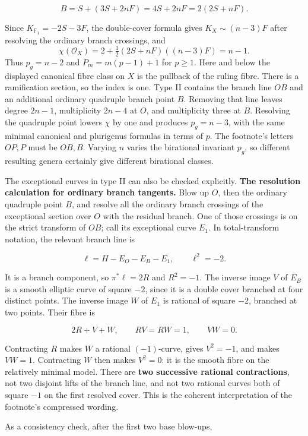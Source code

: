 \[
B=S+(3S+2nF)=4S+2nF=2(2S+nF).
\]

Since \(K_{\mathbb F_1}=-2S-3F\), the double-cover formula gives \(K_X\sim(n-3)F\) after resolving the ordinary branch crossings, and
\[
\chi(\mathcal O_X)=2+\tfrac12(2S+nF)((n-3)F)=n-1.
\]
Thus \(p_g=n-2\) and \(P_m=m(p-1)+1\) for \(p\ge1\). Here and below the displayed canonical fibre class on \(X\) is the pullback of the ruling fibre. There is a ramification section, so the index is one. Type II contains the branch line \(OB\) and an additional ordinary quadruple branch point \(B\). Removing that line leaves degree \(2n-1\), multiplicity \(2n-4\) at \(O\), and multiplicity three at \(B\). Resolving the quadruple point lowers \(\chi\) by one and produces \(p_g=n-3\), with the same minimal canonical and plurigenus formulas in terms of \(p\). The footnote's letters \(OP,P\) must be \(OB,B\). Varying \(n\) varies the birational invariant \(p_g\), so different resulting genera certainly give different birational classes.

The exceptional curves in type II can also be checked explicitly. \textbf{The resolution calculation for ordinary branch tangents.} Blow up \(O\), then the ordinary quadruple point \(B\), and resolve all the ordinary branch crossings of the exceptional section over \(O\) with the residual branch. One of those crossings is on the strict transform of \(OB\); call its exceptional curve \(E_1\). In total-transform notation, the relevant branch line is

\[
\ell=H-E_O-E_B-E_1,\qquad \ell^2=-2.
\]

It is a branch component, so \(\pi^*\ell=2R\) and \(R^2=-1\). The inverse image \(V\) of \(E_B\) is a smooth elliptic curve of square \(-2\), since it is a double cover branched at four distinct points. The inverse image \(W\) of \(E_1\) is rational of square \(-2\), branched at two points. Their fibre is

\[
2R+V+W,\qquad R V=R W=1,\qquad V W=0.
\]

Contracting \(R\) makes \(W\) a rational \((-1)\)-curve, gives \(V^2=-1\), and makes \(V W=1\). Contracting \(W\) then makes \(V^2=0\): it is the smooth fibre on the relatively minimal model. There are \textbf{two successive rational contractions}, not two disjoint lifts of the branch line, and not two rational curves both of square \(-1\) on the first resolved cover. This is the coherent interpretation of the footnote's compressed wording.

As a consistency check, after the first two base blow-ups,

